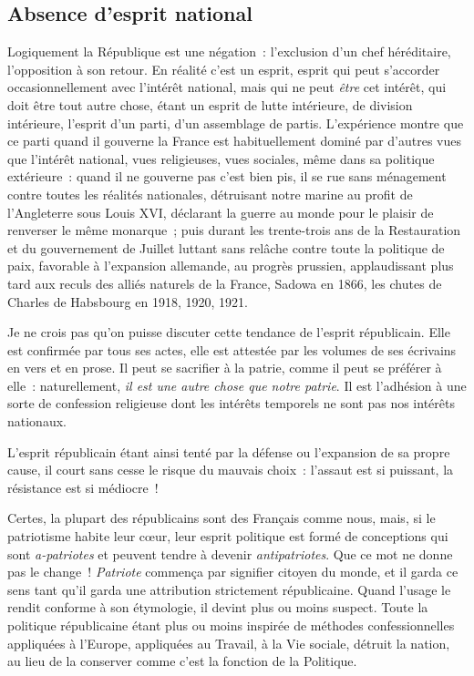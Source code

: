 \documentclass[french,twoside]{book} %
\begin{document}
\subsection[{Absence d’esprit national}]{Absence d’esprit national}
\noindent Logiquement la République est une négation : l’exclusion d’un chef héréditaire, l’opposition à son retour. En réalité c’est un esprit, esprit qui peut s’accorder occasionnellement avec l’intérêt national, mais qui ne peut \emph{être} cet intérêt, qui doit être tout autre chose, étant un esprit de lutte intérieure, de division intérieure, l’esprit d’un parti, d’un assemblage de partis. L’expérience montre que ce parti quand il gouverne la France est habituellement dominé par d’autres vues que l’intérêt national, vues religieuses, vues sociales, même dans sa politique extérieure : quand il ne gouverne pas c’est bien pis, il se rue sans ménagement contre toutes les réalités nationales, détruisant notre marine au profit de l’Angleterre sous Louis XVI, déclarant la guerre au monde pour le plaisir de renverser le même monarque ; puis durant les trente-trois ans de la Restauration et du gouvernement de Juillet luttant sans relâche contre toute la politique de paix, favorable à l’expansion allemande, au progrès prussien, applaudissant plus tard aux reculs des alliés naturels de la France, Sadowa en 1866, les chutes de Charles de Habsbourg en 1918, 1920, 1921.\par
Je ne crois pas qu’on puisse discuter cette tendance de l’esprit républicain. Elle est confirmée par tous ses actes, elle est attestée par les volumes de ses écrivains en vers et en prose. Il peut se sacrifier à la patrie, comme il peut se préférer à elle : naturellement, \emph{il est une autre chose que notre patrie}. Il est l’adhésion à une sorte de confession religieuse dont les intérêts temporels ne sont pas nos intérêts nationaux.\par
L’esprit républicain étant ainsi tenté par la défense ou l’expansion de sa propre cause, il court sans cesse le risque du mauvais choix : l’assaut est si puissant, la résistance est si médiocre !\par
Certes, la plupart des républicains sont des Français comme nous, mais, si le patriotisme habite leur cœur, leur esprit politique est formé de conceptions qui sont \emph{a-patriotes} et peuvent tendre à devenir \emph{antipatriotes}. Que ce mot ne donne pas le change ! \emph{Patriote} commença par signifier citoyen du monde, et il garda ce sens tant qu’il garda une attribution strictement républicaine. Quand l’usage le rendit conforme à son étymologie, il devint plus ou moins suspect. Toute la politique républicaine étant plus ou moins inspirée de méthodes confessionnelles appliquées à l’Europe, appliquées au Travail, à la Vie sociale, détruit la nation, au lieu de la conserver comme c’est la fonction de la Politique.\par
\end{document}
